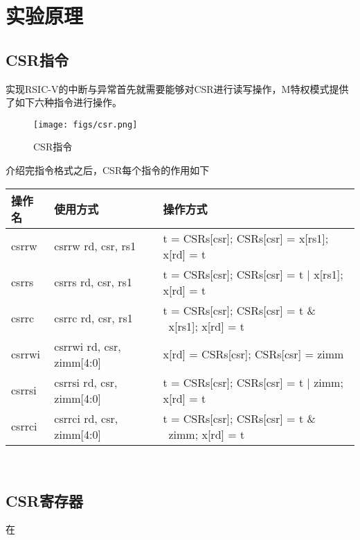
\section{实验原理}
\subsection{CSR指令}
实现RSIC-V的中断与异常首先就需要能够对CSR进行读写操作，M特权模式提供了如下六种指令进行操作。\\

\begin{figure}[H] %
    \centering %
    \texttt{[image: figs/csr.png]} %
    \caption{CSR指令} %
    \label{Fig.1} %
\end{figure}

介绍完指令格式之后，CSR每个指令的作用如下\\

\begin{tabular}{|l|l|l|}
    \hline
    操作名 & 使用方式 & 操作方式\\
    \hline
    csrrw & csrrw rd, csr, rs1 & t = CSRs[csr]; CSRs[csr] = x[rs1]; x[rd] = t \\
    \hline
    csrrs & csrrs rd, csr, rs1 & t = CSRs[csr]; CSRs[csr] = t | x[rs1]; x[rd] = t \\
    \hline
    csrrc & csrrc rd, csr, rs1  & t = CSRs[csr]; CSRs[csr] = t \& ~x[rs1]; x[rd] = t \\
    \hline
    csrrwi & csrrwi rd, csr, zimm[4:0] & x[rd] = CSRs[csr]; CSRs[csr] = zimm \\
    \hline
    csrrsi & csrrsi rd, csr, zimm[4:0] & t = CSRs[csr]; CSRs[csr] = t | zimm; x[rd] = t \\
    \hline 
    csrrci & csrrci rd, csr, zimm[4:0] & t = CSRs[csr]; CSRs[csr] = t \& ~zimm; x[rd] = t \\
    \hline
\end{tabular} \\

\subsection{CSR寄存器}
在

